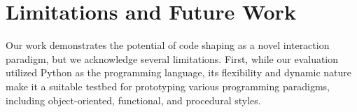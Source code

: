 \section{Limitations and Future Work}
Our work demonstrates the potential of code shaping as a novel interaction paradigm, but we acknowledge several limitations.
First, while our evaluation utilized Python as the programming language, its flexibility and dynamic nature make it a suitable testbed for prototyping various programming paradigms, including object-oriented, functional, and procedural styles. 

